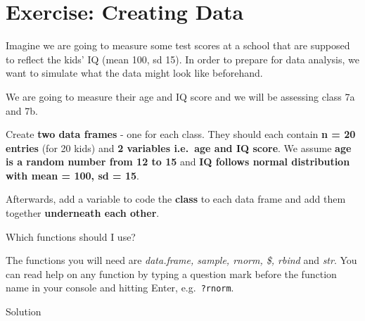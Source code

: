 \documentclass[
]{book}
\begin{document}
\section{Exercise: Creating Data}\label{exercise-creating-data}

Imagine we are going to measure some test scores at a school that are supposed to reflect the kids' IQ (mean 100, sd 15).
In order to prepare for data analysis, we want to simulate what the data might look like beforehand.

We are going to measure their age and IQ score and we will be assessing class 7a and 7b.

Create \textbf{two data frames} - one for each class.
They should each contain \textbf{n = 20 entries} (for 20 kids) and \textbf{2 variables i.e.~age and IQ score}.
We assume \textbf{age is a random number from 12 to 15} and \textbf{IQ follows normal distribution with mean = 100, sd = 15}.

Afterwards, add a variable to code the \textbf{class} to each data frame and add them together \textbf{underneath each other}.

Which functions should I use?

The functions you will need are \emph{data.frame, sample, rnorm, \$, rbind} and \emph{str}.
You can read help on any function by typing a question mark before the function name in your console and hitting Enter, e.g.~\texttt{?rnorm}.

Solution
\end{document}
